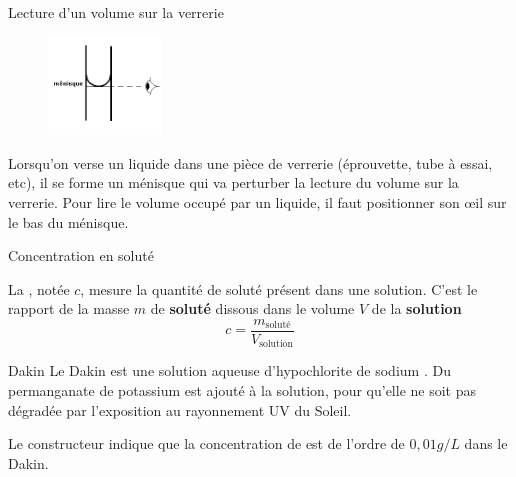 \newpage
\begin{doc}{Lecture d'un volume sur la verrerie}

\begin{figure}
\vspace{-2cm}
    \centering
      \includegraphics[width=0.27\textwidth]{Images/Activite/Chap1/Lecture_Verrerie.png}
  \end{figure}
  Lorsqu'on verse un liquide dans une pièce de verrerie (éprouvette, tube à essai, etc), il se forme un ménisque qui va perturber la lecture du volume sur la verrerie. Pour lire le volume occupé par un liquide, il faut positionner son \oe il sur le bas du ménisque.
\end{doc}

\begin{doc}{Concentration en soluté}
  \label{doc:concentration}
  \vspace*{-24pt}
  \begin{tcolorbox}[colback=green!5!white,colframe=green!75!black,title=\textbf{Concentration massique}]
    La , notée $c$, mesure la quantité de soluté présent dans une solution.
    C'est le rapport de la masse $m$ de \textbf{soluté} dissous dans le volume $V$ de la \textbf{solution}
    \begin{equation*}
      c = \frac{m_\text{soluté}}{V_\text{solution}}
    \end{equation*}
  \end{tcolorbox}
  
\end{doc}


\newpage
\begin{doc}{Dakin}
  \label{doc:dakin}
  Le Dakin est une solution aqueuse d'hypochlorite de sodium .
  Du permanganate de potassium  est ajouté à la solution, pour qu'elle ne soit pas dégradée par l'exposition au rayonnement UV du Soleil.
  
  \fleche Le constructeur indique que la concentration de  est de l'ordre de $0,\!01 \unit{g/L}$ dans le Dakin.
\end{doc}


